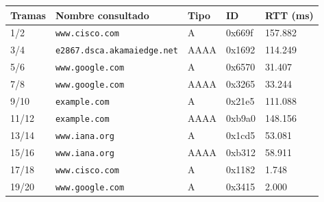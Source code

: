 \begin{tabularx}{\textwidth}{lXlll}
\toprule
Tramas & Nombre consultado & Tipo & ID & RTT (ms) \\
\midrule
1/2 & \nolinkurl{www.cisco.com} & A & 0x669f & 157.882 \\
3/4 & \nolinkurl{e2867.dsca.akamaiedge.net} & AAAA & 0x1692 & 114.249 \\
5/6 & \nolinkurl{www.google.com} & A & 0x6570 & 31.407 \\
7/8 & \nolinkurl{www.google.com} & AAAA & 0x3265 & 33.244 \\
9/10 & \nolinkurl{example.com} & A & 0x21e5 & 111.088 \\
11/12 & \nolinkurl{example.com} & AAAA & 0xb9a0 & 148.156 \\
13/14 & \nolinkurl{www.iana.org} & A & 0x1cd5 & 53.081 \\
15/16 & \nolinkurl{www.iana.org} & AAAA & 0xb312 & 58.911 \\
17/18 & \nolinkurl{www.cisco.com} & A & 0x1182 & 1.748 \\
19/20 & \nolinkurl{www.google.com} & A & 0x3415 & 2.000 \\
\bottomrule
\end{tabularx}
